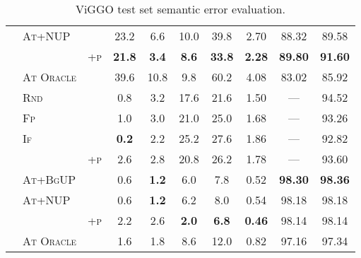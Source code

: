 \begin{table*}[t!]
\begin{tabular}{lll c c c c  c c c}
&\textsc{At+NUP} & &23.2&6.6&10.0&39.8&2.70&88.32&89.58 \\
&  & \textsc{+p}&\textbf{ 21.8}&\textbf{  3.4}&\textbf{  8.6}&\textbf{ 33.8}&\textbf{ 2.28}&\textbf{89.80}&\textbf{91.60} \\
&\textsc{At Oracle} & &39.6&10.8&9.8&60.2&4.08&83.02&85.92 \\
\midrule
\parbox[t]{2mm}{}
&\textsc{Rnd} & &0.8&3.2&17.6&21.6&1.50&---&94.52 \\
&\textsc{Fp} & &1.0&3.0&21.0&25.0&1.68&---&93.26 \\
&\textsc{If} & &\textbf{  0.2}&2.2&25.2&27.6&1.86&---&92.82 \\
&  & \textsc{+p}&2.6&2.8&20.8&26.2&1.78&---&93.60 \\
&\textsc{At+BgUP} & &0.6&\textbf{  1.2}&6.0&7.8&0.52&\textbf{98.30}&\textbf{98.36} \\
&\textsc{At+NUP} & &0.6&\textbf{  1.2}&6.2&8.0&0.54&98.18&98.18 \\
&  & \textsc{+p}&2.2&2.6&\textbf{  2.0}&\textbf{  6.8}&\textbf{ 0.46}&98.14&98.14 \\
&\textsc{At Oracle} & &1.6&1.8&8.6&12.0&0.82&97.16&97.34 \\
\midrule
\end{tabular}

\caption{ViGGO test set semantic error evaluation.}
\label{app:viggo.sem}
\end{table*}
